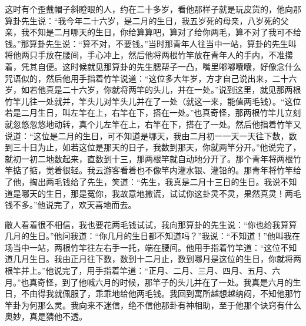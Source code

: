 \documentclass[12pt,UTF8]{ctexbook}
\begin{document}
这时有个歪戴帽子斜瞪眼的人，约在二十多岁，看他那样子就是玩皮货的，他向那算卦先生说：“我今年二十六岁，是二月的生日，我五岁死的母亲，八岁死的父亲，我不知是二月哪天的生日，你给算算吧，算对了给你两毛，算不对了我可不给钱。”那算卦先生说：“算不对，不要钱。”当时那青年人往当中一站，算卦的先生叫将他两只手放在腰间，手心冲上，然后他将两根竹竿放在青年人的手内，不准攥着，凭其自便。这时候就见那算卦的先生腮帮子一凸，嘴里嘟嘟囔囔，好像念什么咒语似的，然后他用手指着竹竿说道：“这位多大年岁，方才自己说出来，二十六岁，如若他真是二十六岁，你就将两竿的头儿，并在一处。”说到这里，就见那两根竹竿儿往一处就并，竿头儿对竿头儿并在了一处（就这一来，能值两毛钱）。“这位若是二月生日，叫左竿在上，右竿在下，搭在一处。”也真奇怪，那两根竹竿儿立刻就忽悠忽悠地动转，真个儿左竿在上，右竿在下，搭在了一处。然后他指着竹竿又说道：“这位是二月的生日，可不知道是哪天，我由二月初一一天一天往下数，数到三十日为止，如若这位是那天的日子，我数到那天，你就两竿分开。”他说完了，就初一初二地数起来，直数到十三，那两根竿就自动地分开了。那个青年将两根竹竿掂了掂，觉着很轻。我云游客看着也不像竿内灌水银、灌铅的。那青年将竹竿给了他，掏出两毛钱给了先生，笑道：“先生，我真是二月十三日的生日。我说不知道是哪天的生日，那是冤你，我故意地撒谎，试试你这卦灵不灵，果然真灵！两毛钱不多。”他说完了，欢天喜地而去。

敝人看着很不相信，我也要花两毛钱试试，我向那算卦的先生说：“你也给我算算几月的生日。”他问我道：“你几月的生日都不知道吗？”我说：“不知道！”他叫我在场当中一站，两根竹竿往左右手一托，端在腰间。他用手指着竹竿道：“这位不知道几月生日。我由正月往下数，数到十二月止，数到哪月是这位的生日，你就将两根竿并上。”他说完了，用手指着竿道：“正月、二月、三月、四月、五月、六月。”也真奇怪，到了他喊六月的时候，那竿子的头儿并在了一处。我真是六月的生日，不由得我就佩服了，乖乖地给他两毛钱。我回到寓所越想越纳闷，不知他那竹竿卦为何那么灵。我向来不迷信，绝不信他那卦有神相助，至于他那个诀窍有什么奥妙，真是猜他不透。
\end{document}
